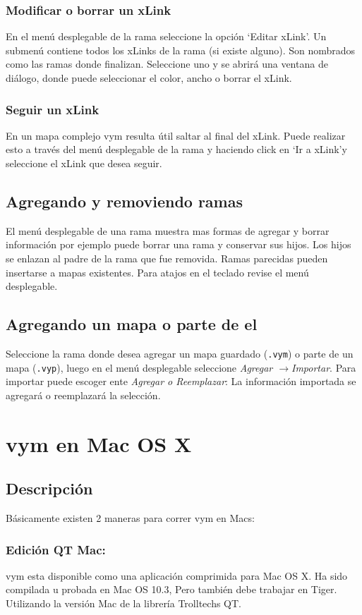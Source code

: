 \documentclass{article}
\newcommand{\vym}{{\sc vym }}
\newcommand{\ra}{$\longrightarrow$}
\begin{document}
\subsubsection*{Modificar o borrar un xLink}
En el men\'u desplegable de la rama seleccione la opci\'on \lq Editar xLink\rq. Un submen\'u contiene todos los xLinks de la rama (si existe alguno). Son nombrados como las ramas donde finalizan. Seleccione uno y se abrir\'a una ventana de di\'alogo, donde puede seleccionar el color, ancho o borrar el xLink.

\subsubsection*{Seguir un xLink}
En un mapa complejo \vym resulta \'util saltar al final del xLink. Puede realizar esto a trav\'es del men\'u desplegable de la rama y haciendo click en \lq Ir a xLink\rq y seleccione el xLink que desea seguir.

\subsection{Agregando y removiendo ramas}
El men\'u desplegable de una rama muestra mas formas de agregar y borrar informaci\'on por ejemplo puede borrar una rama y conservar sus hijos.  Los hijos se enlazan al padre de la rama que fue removida. Ramas parecidas pueden insertarse a mapas existentes. Para atajos en el teclado revise el men\'u desplegable.

\subsection{Agregando un mapa o parte de el}
Seleccione la rama donde desea agregar un mapa guardado ({\tt .vym}) o parte de un mapa ({\tt .vyp}), luego en el men\'u desplegable seleccione {\em Agregar \ra Importar}. Para importar puede escoger ente {\em Agregar o Reemplazar}: La informaci\'on importada se agregar\'a o reemplazar\'a la selecci\'on.

\section{\vym en Mac OS X}
\subsection{Descripci\'on}
B\'asicamente existen 2 maneras para correr \vym en Macs:
\subsubsection*{Edici\'on QT Mac:}
	\vym esta disponible como una aplicaci\'on comprimida para Mac OS X. Ha sido compilada u probada en Mac OS 10.3, Pero tambi\'en debe trabajar en Tiger. Utilizando la versi\'on Mac de la librer\'ia Trolltechs QT. 
\end{document}
